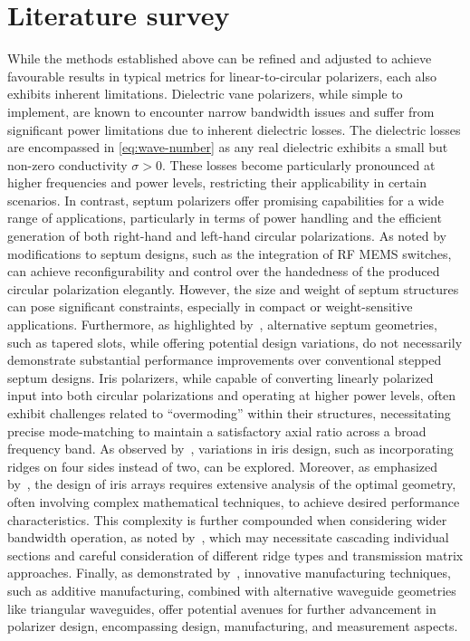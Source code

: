 \documentclass[11pt,a4paper,twoside,openany]{report}
\begin{document}
\section{Literature survey}
While the methods established above can be refined and adjusted to achieve favourable results in typical metrics for linear-to-circular polarizers, each also exhibits inherent limitations. Dielectric vane polarizers, while simple to implement, are known to encounter narrow bandwidth issues and suffer from significant power limitations due to inherent dielectric losses. The dielectric losses are encompassed in \cref{eq:wave-number} as any real dielectric exhibits a small but non-zero conductivity $\sigma > 0$. These losses become particularly pronounced at higher frequencies and power levels, restricting their applicability in certain scenarios. In contrast, septum polarizers offer promising capabilities for a wide range of applications, particularly in terms of power handling and the efficient generation of both right-hand and left-hand circular polarizations. As noted by~\parencite{ruiz-cruz-et-al:compact-reconfigurable-waveguide-circular-polarizer} modifications to septum designs, such as the integration of RF MEMS switches, can achieve reconfigurability and control over the handedness of the produced circular polarization elegantly. However, the size and weight of septum structures can pose significant constraints, especially in compact or weight-sensitive applications. Furthermore, as highlighted by~\parencite{wang-et-al:novel-square-rectangle-waveguide-septum-polarizer}, alternative septum geometries, such as tapered slots, while offering potential design variations, do not necessarily demonstrate substantial performance improvements over conventional stepped septum designs. Iris polarizers, while capable of converting linearly polarized input into both circular polarizations and operating at higher power levels, often exhibit challenges related to \enquote{overmoding} within their structures, necessitating precise mode-matching to maintain a satisfactory axial ratio across a broad frequency band. As observed by~\parencite{song-et-al:design-of-wideband-quad-ridge-waveguide-polarizer}, variations in iris design, such as incorporating ridges on four sides instead of two, can be explored. Moreover, as emphasized by~\parencite{virone-et-al:optimum-iris-set-concept-for-waveguide-polarizers}, the design of iris arrays requires extensive analysis of the optimal geometry, often involving complex mathematical techniques, to achieve desired performance characteristics. This complexity is further compounded when considering wider bandwidth operation, as noted by~\parencite{piltyay-et-al:new-tunable-iris-post-square-waveguide-polarizers-for-satelliste-information-systems}, which may necessitate cascading individual sections and careful consideration of different ridge types and transmission matrix approaches. Finally, as demonstrated by~\parencite{deutschmann-arne:broadband-septum-polarizer-with-triangular-common-port}, innovative manufacturing techniques, such as additive manufacturing, combined with alternative waveguide geometries like triangular waveguides, offer potential avenues for further advancement in polarizer design, encompassing design, manufacturing, and measurement aspects.
\end{document}
